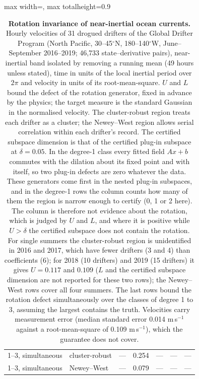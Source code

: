 \begin{table}[!htbp]
\begin{adjustbox}{max width=\textwidth, max totalheight=0.9\textheight}
\begin{tabular}{llrrrrr}
\midrule
1--3, simultaneous & cluster-robust & --- & 0.254 & --- & --- & --- \\
1--3, simultaneous & Newey--West & --- & 0.079 & --- & --- & --- \\
\bottomrule
\end{tabular}
\end{adjustbox}
\caption{\textbf{Rotation invariance of near-inertial ocean currents.} Hourly velocities of 31 drogued drifters of the Global Drifter Program (North Pacific, 30--45$^\circ$N, 180--140$^\circ$W, June--September 2016--2019; 46{,}733 state--derivative pairs), near-inertial band isolated by removing a running mean (49 hours unless stated), time in units of the local inertial period over $2\pi$ and velocity in units of its root-mean-square. $U$ and $L$ bound the defect of the rotation generator, fixed in advance by the physics; the target measure is the standard Gaussian in the normalised velocity. The cluster-robust region treats each drifter as a cluster; the Newey--West region allows serial correlation within each drifter's record. The certified subspace dimension is that of the certified plug-in subspace at $\delta = 0.05$. In the degree-1 class every fitted field $Ax + b$ commutes with the dilation about its fixed point and with itself, so two plug-in defects are zero whatever the data. These generators come first in the nested plug-in subspaces, and in the degree-1 rows the column counts how many of them the region is narrow enough to certify (0, 1 or 2 here). The column is therefore not evidence about the rotation, which is judged by $U$ and $L$, and where it is positive while $U > \delta$ the certified subspace does not contain the rotation. For single summers the cluster-robust region is unidentified in 2016 and 2017, which have fewer drifters (3 and 4) than coefficients (6); for 2018 (10 drifters) and 2019 (15 drifters) it gives $U = 0.117$ and $0.109$ ($L$ and the certified subspace dimension are not reported for these two rows); the Newey--West rows cover all four summers. The last rows bound the rotation defect simultaneously over the classes of degree 1 to 3, assuming the largest contains the truth. Velocities carry measurement error (median standard error 0.014 m\,s$^{-1}$ against a root-mean-square of 0.109 m\,s$^{-1}$), which the guarantee does not cover.}
\label{stab:drifters}
\end{table}
